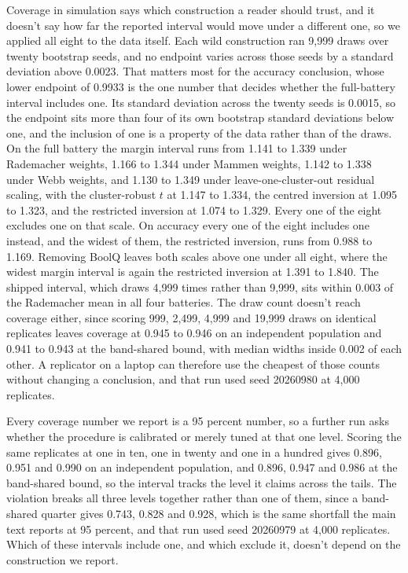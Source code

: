 Coverage in simulation says which construction a reader should trust, and it doesn't say how far the reported interval would move under a different one, so we applied all eight to the data itself. Each wild construction ran 9,999 draws over twenty bootstrap seeds, and no endpoint varies across those seeds by a standard deviation above 0.0023. That matters most for the accuracy conclusion, whose lower endpoint of 0.9933 is the one number that decides whether the full-battery interval includes one. Its standard deviation across the twenty seeds is 0.0015, so the endpoint sits more than four of its own bootstrap standard deviations below one, and the inclusion of one is a property of the data rather than of the draws. On the full battery the margin interval runs from 1.141 to 1.339 under Rademacher weights, 1.166 to 1.344 under Mammen weights, 1.142 to 1.338 under Webb weights, and 1.130 to 1.349 under leave-one-cluster-out residual scaling, with the cluster-robust $t$ at 1.147 to 1.334, the centred inversion at 1.095 to 1.323, and the restricted inversion at 1.074 to 1.329. Every one of the eight excludes one on that scale. On accuracy every one of the eight includes one instead, and the widest of them, the restricted inversion, runs from 0.988 to 1.169. Removing BoolQ leaves both scales above one under all eight, where the widest margin interval is again the restricted inversion at 1.391 to 1.840. The shipped interval, which draws 4,999 times rather than 9,999, sits within 0.003 of the Rademacher mean in all four batteries. The draw count doesn't reach coverage either, since scoring 999, 2,499, 4,999 and 19,999 draws on identical replicates leaves coverage at 0.945 to 0.946 on an independent population and 0.941 to 0.943 at the band-shared bound, with median widths inside 0.002 of each other. A replicator on a laptop can therefore use the cheapest of those counts without changing a conclusion, and that run used seed 20260980 at 4,000 replicates.

Every coverage number we report is a 95 percent number, so a further run asks whether the procedure is calibrated or merely tuned at that one level. Scoring the same replicates at one in ten, one in twenty and one in a hundred gives 0.896, 0.951 and 0.990 on an independent population, and 0.896, 0.947 and 0.986 at the band-shared bound, so the interval tracks the level it claims across the tails. The violation breaks all three levels together rather than one of them, since a band-shared quarter gives 0.743, 0.828 and 0.928, which is the same shortfall the main text reports at 95 percent, and that run used seed 20260979 at 4,000 replicates. Which of these intervals include one, and which exclude it, doesn't depend on the construction we report.

